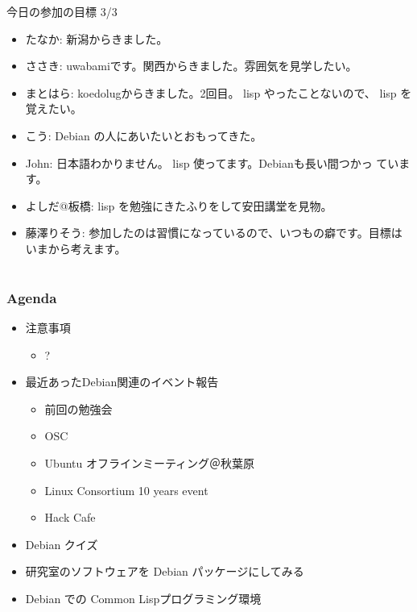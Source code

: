 \begin{frame}{今日の参加の目標 3/3}
 \begin{itemize}
  \item たなか: 新潟からきました。
  \item ささき: uwabamiです。関西からきました。雰囲気を見学したい。
  \item まとはら: koedolugからきました。2回目。 lisp やったことないので、
	lisp を覚えたい。
  \item こう: Debian の人にあいたいとおもってきた。
  \item John: 日本語わかりません。 lisp 使ってます。Debianも長い間つかっ
	ています。
  \item よしだ@板橋: lisp を勉強にきたふりをして安田講堂を見物。
  \item 藤澤りそう: 参加したのは習慣になっているので、いつもの癖です。目標はいまから考えます。
 \end{itemize}
\end{frame}

\section{}
\begin{frame}
 \frametitle{Agenda}
\begin{minipage}[t]{0.45\hsize}
  \begin{itemize}
  \item 注意事項
	\begin{itemize}
	 \item ?
	\end{itemize}
  \item 最近あったDebian関連のイベント報告
	\begin{itemize}
	 \item 前回の勉強会
	 \item OSC
	 \item Ubuntu オフラインミーティング＠秋葉原
	 \item Linux Consortium 10 years event
	 \item Hack Cafe
	\end{itemize}
 \end{itemize}
\end{minipage} 
\begin{minipage}[t]{0.45\hsize}
 \begin{itemize}
  \item Debian クイズ
  \item 研究室のソフトウェアを Debian パッケージにしてみる
  \item Debian での Common Lispプログラミング環境
 \end{itemize}
\end{minipage}
\end{frame}

